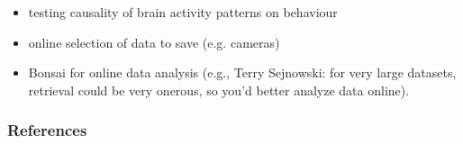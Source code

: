 \documentclass{beamer}
\begin{document}
\begin{frame}
\begin{itemize}
\begin{itemize}
\begin{itemize}
                        \item testing causality of brain activity patterns on
                            behaviour

                        \item online selection of data to save (e.g. cameras)

                        \item Bonsai for online data analysis (e.g., Terry
                            Sejnowski: for very large datasets, retrieval could
                            be very onerous, so you'd better analyze data
                            online).
                    \end{itemize}

            \end{itemize}

    \end{itemize}

\end{frame}

\begin{frame}
    \frametitle{References}

    \tiny{
        
        
    }
\end{frame}
\end{document}
